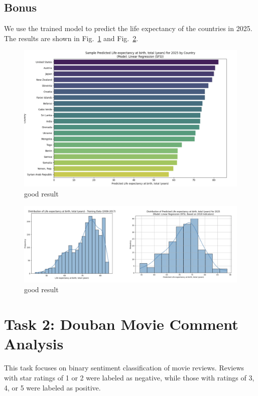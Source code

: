 \documentclass{article}
\begin{document}
\subsection*{Bonus}

We use the trained model to predict the life expectancy of the countries in 2025.
The results are shown in Fig.~\ref{fig:correlation_heatmap3} and Fig.~\ref{fig:correlation_heatmap4}.

\begin{figure}[h]
    \centering
    \includegraphics[width=0.8\columnwidth]{./pic/T1.bonus.1.png} %
    \caption{good result}
    \label{fig:correlation_heatmap3}
\end{figure}

\begin{figure}[h]
    \centering
    \includegraphics[width=0.8\columnwidth]{./pic/T1.bonus.2.png} %
    \caption{good result}
    \label{fig:correlation_heatmap4}
\end{figure}


\section{Task 2: Douban Movie Comment Analysis}
\label{sec:task2}

This task focuses on binary sentiment classification of movie reviews. Reviews with star ratings 
of 1 or 2 were labeled as negative, while those with ratings of 3, 4, or 5 were labeled as positive.
\end{document}
